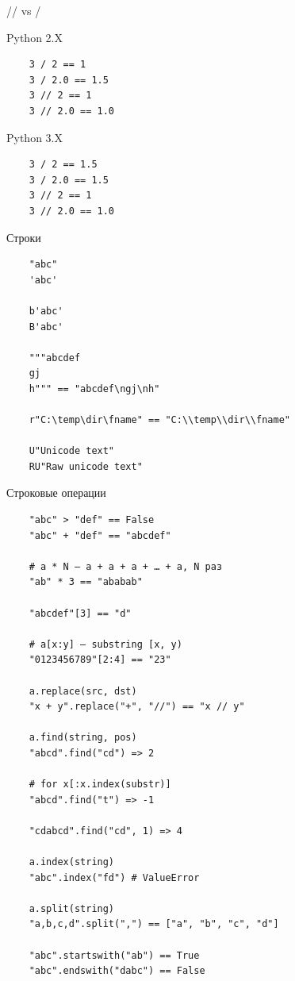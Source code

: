 \documentclass{article}
\begin{document}
\begin{center} // vs / \end{center}
Python 2.X
\begin{lstlisting}
	3 / 2 == 1
	3 / 2.0 == 1.5
	3 // 2 == 1
	3 // 2.0 == 1.0
\end{lstlisting}
Python 3.X
\begin{lstlisting}
	3 / 2 == 1.5
	3 / 2.0 == 1.5
	3 // 2 == 1
	3 // 2.0 == 1.0
\end{lstlisting}
\newpage

\begin{center} Строки \end{center}
\vspace{15pt}
\begin{lstlisting}
	"abc"
	'abc'

	b'abc'
	B'abc'

	"""abcdef
	gj
	h""" == "abcdef\ngj\nh"

	r"C:\temp\dir\fname" == "C:\\temp\\dir\\fname"

	U"Unicode text"
	RU"Raw unicode text"
\end{lstlisting}
\newpage

\begin{center} Строковые операции \end{center}
\vspace{15pt}
\begin{lstlisting}
	"abc" > "def" == False
	"abc" + "def" == "abcdef"

	# a * N – a + a + a + … + a, N раз
	"ab" * 3 == "ababab"

	"abcdef"[3] == "d"

	# a[x:y] – substring [x, y)
	"0123456789"[2:4] == "23"

	a.replace(src, dst)
	"x + y".replace("+", "//") == "x // y"

	a.find(string, pos) 
	"abcd".find("cd") => 2
	
	# for x[:x.index(substr)]
	"abcd".find("t") => -1

	"cdabcd".find("cd", 1) => 4

	a.index(string)
	"abc".index("fd") # ValueError

	a.split(string) 
	"a,b,c,d".split(",") == ["a", "b", "c", "d"]

	"abc".startswith("ab") == True
	"abc".endswith("dabc") == False
\end{lstlisting}
\newpage
\end{document}
